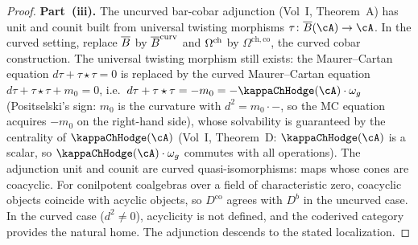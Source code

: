 \begin{proof}
\textbf{Part~(iii).}
The uncurved bar-cobar adjunction (Vol~I, Theorem~A) has unit
and counit built from universal twisting morphisms
$\tau \colon \barB(\cA) \to \cA$. In the curved setting,
replace $\overline{B}$ by $\overline{B}^{\mathrm{curv}}$ and $\Omega^{\mathrm{ch}}$ by
$\Omega^{\mathrm{ch,co}}$, the curved cobar construction. The
universal twisting morphism still exists: the Maurer--Cartan
equation $d\tau + \tau \star \tau = 0$ is replaced by the curved
Maurer--Cartan equation
$d\tau + \tau \star \tau + m_0 = 0$, i.e.\
$d\tau + \tau \star \tau = -m_0 = -\kappaChHodge(\cA) \cdot \omega_g$
(Positselski's sign: $m_0$ is the curvature with
$d^2 = m_0 \cdot {-}$, so the MC equation acquires
$-m_0$ on the right-hand side), whose
solvability is guaranteed by the centrality of $\kappaChHodge(\cA)$ (Vol~I,
Theorem~D: $\kappaChHodge(\cA)$ is a scalar, so $\kappaChHodge(\cA) \cdot \omega_g$
commutes with all operations). The adjunction unit and counit
are curved quasi-isomorphisms: maps whose cones are coacyclic.
For conilpotent coalgebras over a field of characteristic zero,
coacyclic objects coincide with acyclic objects, so $D^{\mathrm{co}}$
agrees with $D^b$ in the uncurved case. In the curved case
($d^2 \neq 0$), acyclicity is not defined, and the coderived
category provides the natural home. The adjunction descends to
the stated localization.
\end{proof}

